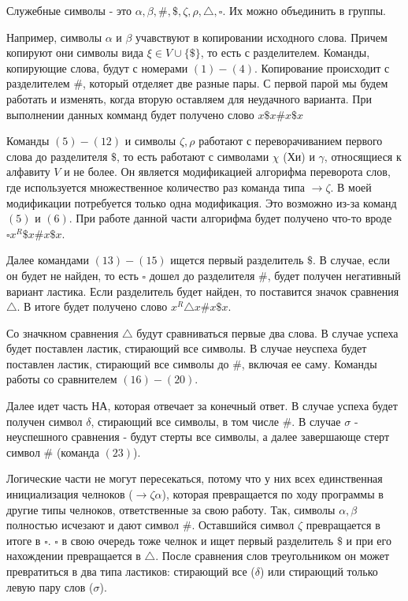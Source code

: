 Служебные символы - это $\alpha, \beta, \#, \$, \zeta, \rho, \triangle, \square$.
Их можно объединить в группы.

Например, символы  $\alpha$ и  $\beta$ учавствуют в копировании исходного слова. Причем
копируют они символы вида  $\xi \in V \cup \{\$\} $, то есть с разделителем. Команды,
копирующие слова, будут с номерами $(1) - (4)$. Копирование происходит с
разделителем  $\#$, который отделяет две разные пары. С первой парой мы будем работать и
изменять, когда вторую оставляем для неудачного варианта. При выполнении данных комманд
будет получено слово $x\$x\#x\$x$

Команды  $(5) - (12)$ и символы  $\zeta, \rho$ работают с переворачиванием первого
слова до разделителя  $\$$, то есть работают с символами  $\chi$ (Хи) и  $\gamma$, относящиеся
к алфавиту $V$ и не более. Он является модификацией алгорифма переворота слов, где
используется множественное количество раз команда типа $ \to \zeta$. В моей модификации
потребуется только одна модификация. Это возможно из-за команд $(5)$ и  $(6)$.
При работе данной части алгорифма будет получено что-то вроде  $\square x^{R}\$x\#x\$x$.

Далее командами $(13) - (15)$ ищется первый разделитель  $\$$. В случае, если он будет
не найден, то есть  $\square$ дошел до разделителя  $\#$, будет получен негативный вариант 
ластика. Если разделитель будет найден, то поставится значок сравнения $\triangle$. В итоге будет
получено слово $x^{R}\triangle x\#x\$x$.

Со значкном сравнения  $\triangle$ будут сравниваться первые два слова. В случае успеха
будет поставлен ластик, стирающий все символы. В случае неуспеха будет поставлен
ластик, стирающий все символы до  $\#$, включая ее саму. Команды работы
со сравнителем  $(16) - (20)$.

Далее идет часть НА, которая отвечает за конечный ответ. В случае успеха
будет получен символ  $\delta$, стирающий все символы, в том числе  $\#$. В
случае  $\sigma$ - неуспешного сравнения - будут стерты все символы, а далее
завершающе стерт символ  $\#$ (команда $(23)$).

\medskip

Логические части не могут пересекаться, потому что у них всех 
единственная инициализация челноков ($\to \zeta\alpha$), которая
превращается по ходу программы в другие типы челноков, ответственные
за свою работу. Так, символы $\alpha, \beta$ полностью исчезают и
дают символ  $\#$. Оставшийся символ  $\zeta$ превращается в итоге
в  $\square$.  $\square$ в свою очередь тоже челнок и ищет
первый разделитель  $\$$ и при его нахождении превращается
в  $\triangle$. После сравнения слов треугольником он может
превратиться в два типа ластиков: стирающий все ($\delta$) 
или стирающий только левую пару слов ($\sigma$).

